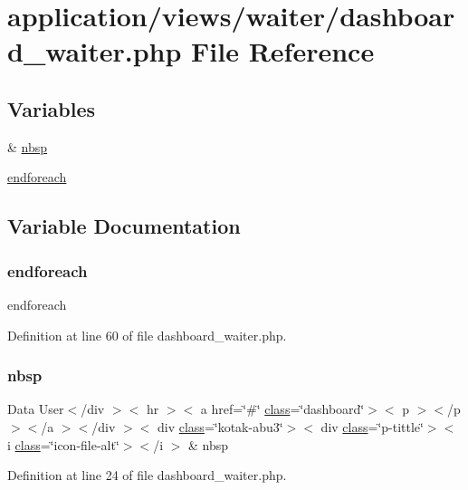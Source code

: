 \hypertarget{dashboard__waiter_8php}{}\section{application/views/waiter/dashboard\+\_\+waiter.php File Reference}
\label{dashboard__waiter_8php}
\subsection*{Variables}
\begin{DoxyCompactItemize}
\item 
\& \mbox{\hyperlink{dashboard__waiter_8php_a58ff17d0c58fe06d2c260c11a692a306}{nbsp}}
\item 
\mbox{\hyperlink{dashboard__waiter_8php_a672d9707ef91db026c210f98cc601123}{endforeach}}
\end{DoxyCompactItemize}


\subsection{Variable Documentation}
\mbox{\label{dashboard__waiter_8php_a672d9707ef91db026c210f98cc601123}} 
\subsubsection{\texorpdfstring{endforeach}{endforeach}}
{\footnotesize\ttfamily endforeach}



Definition at line 60 of file dashboard\+\_\+waiter.\+php.

\mbox{\label{dashboard__waiter_8php_a58ff17d0c58fe06d2c260c11a692a306}} 
\subsubsection{\texorpdfstring{nbsp}{nbsp}}
{\footnotesize\ttfamily Data User$<$/div $>$$<$ hr $>$$<$ a href=\char`\"{}\#\char`\"{} \mbox{\hyperlink{waiter_2olaporan_8php_a185c73c6507391d1eb38c776b68ce96d}{class}}=\char`\"{}dashboard\char`\"{}$>$$<$ p $>$$<$/p $>$$<$/a $>$$<$/div $>$$<$ div \mbox{\hyperlink{waiter_2olaporan_8php_a185c73c6507391d1eb38c776b68ce96d}{class}}=\char`\"{}kotak-\/abu3\char`\"{}$>$$<$ div \mbox{\hyperlink{waiter_2olaporan_8php_a185c73c6507391d1eb38c776b68ce96d}{class}}=\char`\"{}p-\/tittle\char`\"{}$>$$<$ i \mbox{\hyperlink{waiter_2olaporan_8php_a185c73c6507391d1eb38c776b68ce96d}{class}}=\char`\"{}icon-\/file-\/alt\char`\"{}$>$$<$/i $>$ \& nbsp}



Definition at line 24 of file dashboard\+\_\+waiter.\+php.

